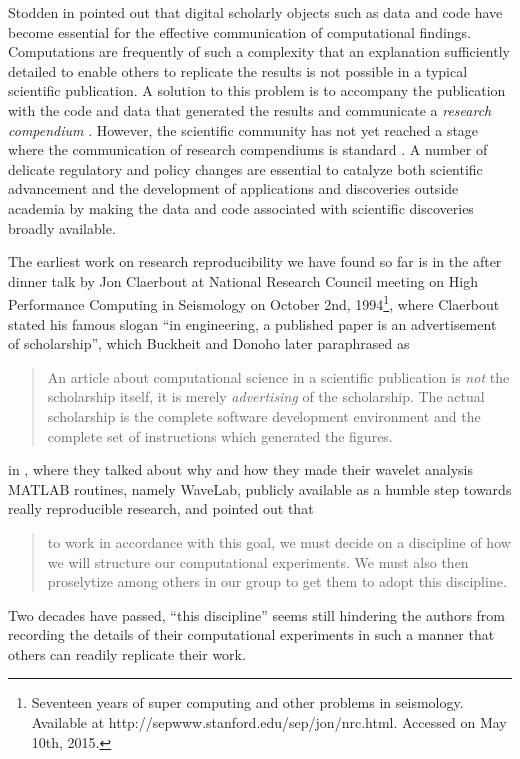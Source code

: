 Stodden in \cite{stodden2014enabling} pointed out that digital scholarly objects such as data and code have become essential for the effective communication of computational findings. Computations are frequently of such a complexity that an explanation sufficiently detailed to enable others to replicate the results is not possible in a typical scientific publication. A solution to this problem is to accompany the publication with the code and data that generated the results and communicate a \emph{research compendium} \cite{gentleman2007statistical}. However, the scientific community has not yet reached a stage where the communication of research compendiums is standard \cite{donoho2009reproducible}. A number of delicate regulatory and policy changes are essential to catalyze both scientific advancement and the development of applications and discoveries outside academia by making the data and code associated with scientific discoveries broadly available.


The earliest work on research reproducibility we have found so far is in the after dinner talk by Jon Claerbout at National Research Council meeting on High Performance Computing in Seismology on October 2nd, 1994\footnote{Seventeen years of super computing and other problems in seismology. Available at http://sepwww.stanford.edu/sep/jon/nrc.html. Accessed on May 10th, 2015.}, where Claerbout stated his famous slogan ``in engineering, a published paper is an advertisement of scholarship'', which Buckheit and Donoho later paraphrased as 
\begin{quote}
	An article about computational science in a scientific publication is \emph{not} the
	scholarship itself, it is merely \emph{advertising} of the scholarship. The actual scholarship is the 
	complete software development environment and the complete set
	of instructions which generated the figures.
\end{quote}
in \cite{buckheit1995wavelab}, where they talked about why and how they
made their wavelet analysis MATLAB routines, namely WaveLab, publicly available as a humble step towards really reproducible research, and pointed out that
\begin{quote}
	to work in accordance with this goal, we must decide on a discipline
	of how we will structure our computational experiments. We must also then proselytize
	among others in our group to get them to adopt this discipline.
\end{quote}
Two decades have passed, ``this discipline'' seems still hindering the authors from recording the details of their computational experiments in such a manner that others can readily replicate their work.

